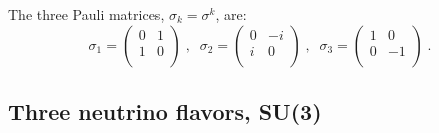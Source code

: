 \documentclass[final,5p,times,twocolumn,sort,compress]{elsarticle}
\begin{document}
The three Pauli matrices, $\sigma_k = \sigma^k$, are:
\begin{equation}
 \sigma_1
 =
 \left(\begin{array}{cc}
  0 & 1 \\
  1 & 0 \\
 \end{array}\right)
 \;, \;\;
 \sigma_2
 =
 \left(\begin{array}{cc}
  0 & -i \\
  i & 0 \\
 \end{array}\right)
 \;, \;\;
 \sigma_3
 =
 \left(\begin{array}{cc}
  1 & 0 \\
  0 & -1 \\
 \end{array}\right) \;.
\end{equation}


\subsection{Three neutrino flavors, SU(3)}
\end{document}
